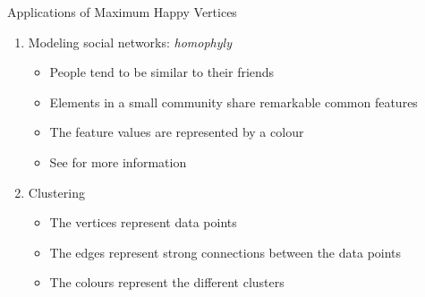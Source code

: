 \documentclass[11pt,t, usenames, dvipsnames]{beamer}
\begin{document}
\begin{frame}{Applications of Maximum Happy Vertices}
    \begin{enumerate}
        \item<1-> Modeling social networks: \textit{homophyly}
        \begin{itemize}
            \item People tend to be similar to their friends
            \item Elements in a small community share remarkable common features
            \item The feature values are represented by a colour
            \item See \cite{easley2010networks, li2011community, li2012small} for more information
        \end{itemize}
        
        \item<2-> Clustering 
        \begin{itemize}
            \item The vertices represent data points
            \item The edges represent strong connections between the data points
            \item The colours represent the different clusters
        \end{itemize}
    \end{enumerate}
\end{frame}
\end{document}
